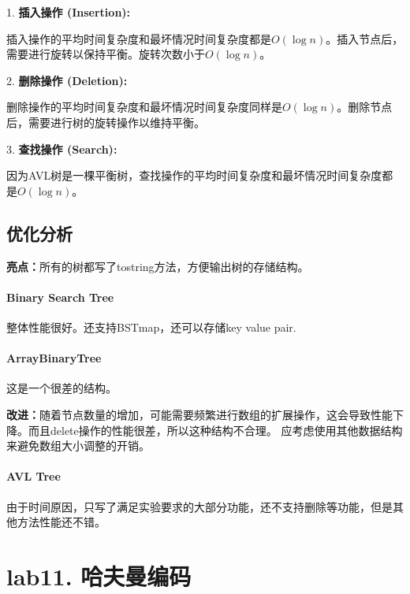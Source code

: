 \documentclass[UTF8]{ctexart}
\begin{document}
1. \textbf{插入操作 (Insertion):}

   插入操作的平均时间复杂度和最坏情况时间复杂度都是$O(\log n)$。插入节点后，需要进行旋转以保持平衡。旋转次数小于$O(\log n)$。
   
2. \textbf{删除操作 (Deletion):}

   删除操作的平均时间复杂度和最坏情况时间复杂度同样是$O(\log n)$。删除节点后，需要进行树的旋转操作以维持平衡。

3. \textbf{查找操作 (Search):}

   因为AVL树是一棵平衡树，查找操作的平均时间复杂度和最坏情况时间复杂度都是$O(\log n)$。

\subsection*{优化分析}

\textbf{亮点：}所有的树都写了tostring方法，方便输出树的存储结构。

\paragraph*{Binary Search Tree}
整体性能很好。还支持BSTmap，还可以存储key value pair.

\paragraph*{ArrayBinaryTree}
 这是一个很差的结构。

\textbf{改进：}随着节点数量的增加，可能需要频繁进行数组的扩展操作，这会导致性能下降。而且delete操作的性能很差，所以这种结构不合理。
应考虑使用其他数据结构来避免数组大小调整的开销。


\paragraph*{AVL Tree}
由于时间原因，只写了满足实验要求的大部分功能，还不支持删除等功能，但是其他方法性能还不错。


\newpage
\section*{lab11. 哈夫曼编码}
\end{document}
